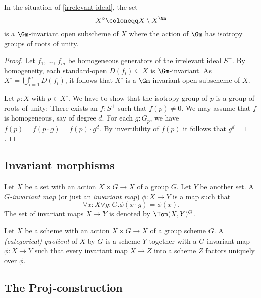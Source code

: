 \begin{proposition}
  In the situation of \cref{irrelevant ideal}, the set
  \begin{equation*}
    X^\circ \coloneqq X \setminus X^{\Gm}
  \end{equation*}
  is a $\Gm$-invariant open subscheme of $X$ where the action of $\Gm$ has
  isotropy groups of roots of unity.
\end{proposition}

\begin{proof}
  Let $f_1$, \dots, $f_m$ be homogeneous generators of the irrelevant
  ideal $S^+$.  By homogeneity, each standard-open
  $D(f_i) \subseteq X$ is $\Gm$-invariant.  As
  $X^\circ = \bigcup_{i = 1}^m D(f_i)$, it follows that $X^\circ$ is a
  $\Gm$-invariant open subscheme of $X$.

  Let $p : X$ with $p \in X^\circ$.  We have to show that the isotropy group of $p$
  is a group of roots of unity: There exists an $f : S^+$ such that
  $f(p) \neq 0$.  We may assume that $f$ is homogeneous, say of degree
  $d$.  For each $g : G_p$, we have
  $f(p) = f(p \cdot g) = f(p) \cdot g^d$.  By invertibility of $f(p)$
  it follows that $g^d = 1$.
\end{proof}

\subsection{Invariant morphisms}

\begin{definition}
  Let $X$ be a set with an action $X \times G \to X$ of a group $G$.  Let $Y$ be another
  set.  A \emph{$G$-invariant map} (or just an \emph{invariant map})
  $\phi : X \to Y$ is a map such that
  \begin{equation*}
    \forall x: X \forall g: G. \phi(x \cdot g) = \phi(x).
  \end{equation*}
  The set of invariant maps $X \to Y$ is denoted by $\Hom(X, Y)^G$.
\end{definition}

\begin{definition}
  Let $X$ be a scheme with an action $X \times G \to X$ of a group scheme $G$.
  A \emph{(categorical) quotient} of $X$ by $G$ is a scheme $Y$
  together with a $G$-invariant map $\phi : X \to Y$ such that
  every invariant map $X \to Z$ into a scheme $Z$ factors uniquely
  over $\phi$.
\end{definition}

\subsection{The Proj-construction}

